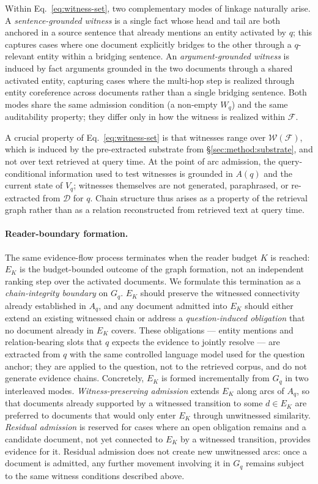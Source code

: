 Within Eq.~\eqref{eq:witness-set}, two complementary modes of linkage
naturally arise. A \emph{sentence-grounded witness} is a single fact whose
head and tail are both anchored in a source sentence that already mentions
an entity activated by $q$; this captures cases where one document
explicitly bridges to the other through a $q$-relevant entity within a
bridging sentence. An \emph{argument-grounded witness} is induced by fact
arguments grounded in the two documents through a shared activated
entity, capturing cases where the multi-hop step is realized through
entity coreference across documents rather than a single bridging
sentence. Both modes share the same admission condition (a non-empty
$W_q$) and the same auditability property; they differ only in how the
witness is realized within $\mathcal{F}$.

A crucial property of Eq.~\eqref{eq:witness-set} is that witnesses range
over $\mathcal{W}(\mathcal{F})$, which is induced by the pre-extracted
substrate from \S\ref{sec:method:substrate}, and not over text retrieved
at query time. At the point of arc admission, the query-conditional
information used to test witnesses is grounded in $A(q)$ and the current
state of $V_q$; witnesses themselves are not generated, paraphrased, or
re-extracted from $\mathcal{D}$ for $q$. Chain structure thus arises as a
property of the retrieval graph rather than as a relation reconstructed
from retrieved text at query time.

\paragraph{Reader-boundary formation.}
\label{sec:method:boundary}
The same evidence-flow process terminates when the reader budget $K$ is
reached: $E_K$ is the budget-bounded outcome of the graph formation, not
an independent ranking step over the activated documents. We formulate
this termination as a \emph{chain-integrity boundary} on $G_q$. $E_K$
should preserve the witnessed connectivity already established in $A_q$,
and any document admitted into $E_K$ should either extend an existing
witnessed chain or address a \emph{question-induced obligation} that no
document already in $E_K$ covers. These obligations --- entity mentions
and relation-bearing slots that $q$ expects the evidence to jointly
resolve --- are extracted from $q$ with the same controlled language model
used for the question anchor; they are applied to the question, not to
the retrieved corpus, and do not generate evidence chains. Concretely,
$E_K$ is formed incrementally from $G_q$ in two interleaved modes.
\emph{Witness-preserving admission} extends $E_K$ along arcs of $A_q$, so
that documents already supported by a witnessed transition to some
$d \in E_K$ are preferred to documents that would only enter $E_K$
through unwitnessed similarity. \emph{Residual admission} is reserved for
cases where an open obligation remains and a candidate document, not yet
connected to $E_K$ by a witnessed transition, provides evidence for it.
Residual admission does not create new unwitnessed arcs: once a document
is admitted, any further movement involving it in $G_q$ remains subject
to the same witness conditions described above.
